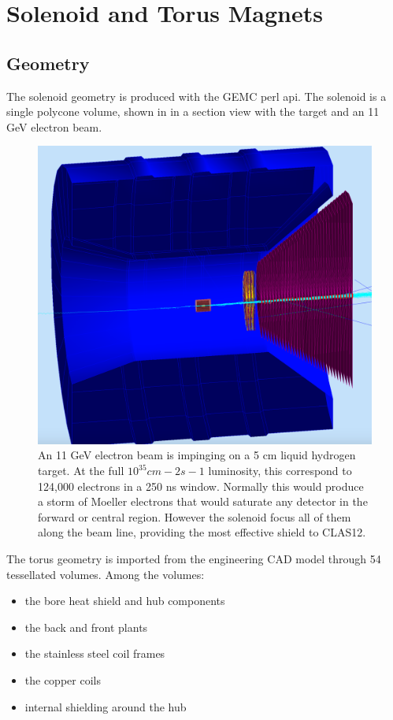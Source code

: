 \section{Solenoid and Torus Magnets}


\subsection{Geometry}
The solenoid geometry is produced with the GEMC perl api. The solenoid is a single polycone volume, shown in 
in a section view with the target and an 11 GeV electron beam.

\begin{figure}
	\centering
	\includegraphics[width=0.98\columnwidth,keepaspectratio]{img/solenoid.png}
   \caption{An 11 GeV electron beam is impinging on a 5 cm liquid hydrogen target. At the full $10^{35} cm-2s-1$ luminosity, this correspond to
            124,000 electrons in a 250 ns window. Normally this would produce a storm of Moeller electrons that would saturate any detector in the forward or central
				region. However the solenoid focus all of them along the beam line, providing the most effective shield to CLAS12.
            }
	\label{fig:solenoid}
\end{figure}

The torus geometry is imported from the engineering CAD model through 54 tessellated volumes. Among the volumes:

\begin{itemize}
	\item the bore heat shield and hub components
	\item the back and front plants
	\item the stainless steel coil frames
	\item the copper coils
	\item internal shielding around the hub
\end{itemize}

